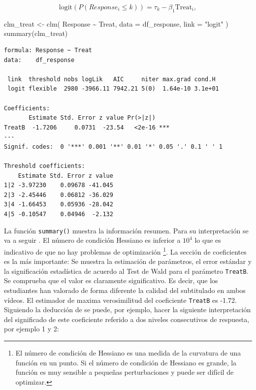 \documentclass[
  12pt,
  a4paper,
  extrafontsizes,
  onecolumn,
  openright,
  table]{memoir}
\newenvironment{Shaded}{\begin{snugshade}}{\end{snugshade}}
\newcommand{\AttributeTok}[1]{\textcolor[rgb]{0.40,0.45,0.13}{#1}}
\newcommand{\FunctionTok}[1]{\textcolor[rgb]{0.28,0.35,0.67}{#1}}
\newcommand{\NormalTok}[1]{\textcolor[rgb]{0.00,0.23,0.31}{#1}}
\newcommand{\OtherTok}[1]{\textcolor[rgb]{0.00,0.23,0.31}{#1}}
\newcommand{\SpecialCharTok}[1]{\textcolor[rgb]{0.37,0.37,0.37}{#1}}
\newcommand{\StringTok}[1]{\textcolor[rgb]{0.13,0.47,0.30}{#1}}
\begin{document}
\[
\text{logit}(P(Response_i \leq k)) = \tau_k - \beta_1 \text{Treat}_i,
\]

\scriptsize

\begin{Shaded}
\begin{Highlighting}[]
\NormalTok{clm\_treat }\OtherTok{\textless{}{-}}
    \FunctionTok{clm}\NormalTok{(}
\NormalTok{        Response }\SpecialCharTok{\textasciitilde{}}\NormalTok{ Treat,}
        \AttributeTok{data =}\NormalTok{ df\_response, }\AttributeTok{link =} \StringTok{"logit"}
\NormalTok{    )}
\FunctionTok{summary}\NormalTok{(clm\_treat)}
\end{Highlighting}
\end{Shaded}

\begin{verbatim}
formula: Response ~ Treat
data:    df_response

 link  threshold nobs logLik   AIC     niter max.grad cond.H 
 logit flexible  2980 -3966.11 7942.21 5(0)  1.64e-10 3.1e+01

Coefficients:
       Estimate Std. Error z value Pr(>|z|)    
TreatB  -1.7206     0.0731  -23.54   <2e-16 ***
---
Signif. codes:  0 '***' 0.001 '**' 0.01 '*' 0.05 '.' 0.1 ' ' 1

Threshold coefficients:
    Estimate Std. Error z value
1|2 -3.97230    0.09678 -41.045
2|3 -2.45446    0.06812 -36.029
3|4 -1.66453    0.05936 -28.042
4|5 -0.10547    0.04946  -2.132
\end{verbatim}

\normalsize

La función \texttt{summary()} muestra la información resumen. Para su
interpretación se va a seguir \textcite{christensen2018CumulativeLM}. El
número de condición Hessiano es inferior a \(10^4\) lo que es indicativo
de que no hay problemas de optimización \footnote{El número de condición
  de Hessiano es una medida de la curvatura de una función en un punto.
  Si el número de condición de Hessiano es grande, la función es muy
  sensible a pequeñas perturbaciones y puede ser difícil de optimizar.}.
La sección de coeficientes es la más importante: Se muestra la
estimación de parámetros, el error estándar y la significación
estadística de acuerdo al Test de Wald para el parámetro
\texttt{TreatB}. Se comprueba que el valor es claramente significativo.
Es decir, que los estudiantes han valorado de forma diferente la calidad
del subtitulado en ambos vídeos. El estimador de maxima verosimilitud
del coeficiente \texttt{TreatB} es -1.72. Siguiendo la deducción de
\textcite{bruin2011} se puede, por ejemplo, hacer la siguiente
interpretación del significado de este coeficiente referido a dos
niveles consecutivos de respuesta, por ejemplo 1 y 2:
\end{document}
